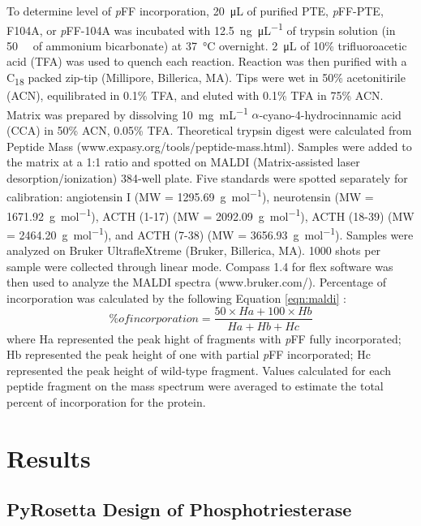 \begin{refsection}
To determine level of \emph{p}FF incorporation, \SI{20}{\micro\liter} of
purified PTE, \emph{p}FF-PTE, F104A, or \emph{p}FF-104A was incubated with
\SI{12.5}{\ng\per\uL} of trypsin solution (in \SI{50}{\milli\Molar} of ammonium
bicarbonate) at \SI{37}{\celsius} overnight. \SI{2}{\uL} of 10\%
trifluoroacetic acid (TFA) was used to quench each reaction. Reaction was then
purified with a C\textsubscript{18} packed zip-tip (Millipore, Billerica, MA).
Tips were wet in 50\% acetonitirile (ACN), equilibrated in 0.1\% TFA, and
eluted with 0.1\% TFA in 75\% ACN. Matrix was prepared by dissolving \SI{10}{\mg\per\mL}
$\alpha$-cyano-4-hydrocinnamic acid (CCA) in 50\% ACN, 0.05\% TFA. Theoretical
trypsin digest were calculated from Peptide Mass
(www.expasy.org/tools/peptide-mass.html). Samples were added to the matrix at a
1:1 ratio and spotted on MALDI (Matrix-assisted laser desorption/ionization)
384-well plate. Five standards were spotted separately for calibration:
angiotensin I (MW = \SI{1295.69}{\g\per\mole}), neurotensin (MW =
\SI{1671.92}{\g\per\mole}), ACTH (1-17) (MW = \SI{2092.09}{\g\per\mole}), ACTH
(18-39) (MW = \SI{2464.20}{\g\per\mole}), and ACTH (7-38) (MW =
\SI{3656.93}{\g\per\mole}). Samples were analyzed on Bruker UltrafleXtreme
(Bruker, Billerica, MA). 1000 shots per sample were collected through linear
mode. Compass 1.4 for flex software was then used to analyze the MALDI spectra
(www.bruker.com/). Percentage of incorporation was calculated by the following
Equation \ref{eqn:maldi} \cite{Voloshchuk2009}:
\begin{equation} 
    \% of incorporation =
    \frac{50 \times Ha + 100 \times Hb}{Ha + Hb +Hc}
    \label{eqn:maldi}
\end{equation}
where Ha represented the peak hight of fragments with \emph{p}FF fully
incorporated; Hb represented the peak height of one with partial \emph{p}FF
incorporated; Hc represented the peak height of wild-type fragment. Values
calculated for each peptide fragment on the mass spectrum were averaged to
estimate the total percent of incorporation for the protein.

\section{Results}

\subsection{PyRosetta Design of Phosphotriesterase}


\end{refsection}
